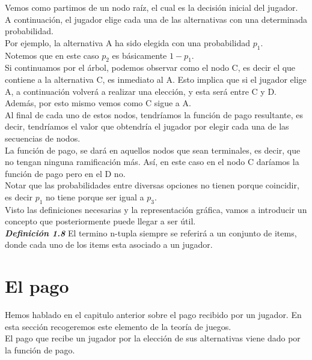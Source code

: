 \documentclass[10pt,a4paper]{book}
\begin{document}
Vemos como partimos de un nodo raíz, el cual es la decisión inicial del jugador. \\ 
A continuación, el jugador elige cada una de las alternativas con una determinada probabilidad.\\
Por ejemplo, la alternativa A ha sido elegida con una probabilidad $p_1$.\\
Notemos que en este caso $p_2$ es básicamente $1-p_1$.\\
Si continuamos por el árbol, podemos observar como el nodo C, es decir el que contiene a la alternativa C, es inmediato al A. Esto implica que si el jugador elige A, a continuación volverá a realizar una elección, y esta será entre C y D.\\
Además, por esto mismo vemos como C sigue a A.\\
Al final de cada uno de estos nodos, tendríamos la función de pago resultante, es decir, tendríamos el valor que obtendría el jugador por elegir cada una de las secuencias de nodos.\\

La función de pago, se dará en aquellos nodos que sean terminales, es decir, que no tengan ninguna ramificación más. Así, en este caso en el nodo C daríamos la función de pago pero en el D no.\\

Notar que las probabilidades entre diversas opciones no tienen porque coincidir, es decir $p_1$ no tiene porque ser igual a $p_3$.\\

Visto las definiciones necesarias y la representación gráfica, vamos a introducir un concepto que posteriormente puede llegar a ser útil. \\

\textit{\textbf{Definición 1.8}} El termino n-tupla siempre se referirá a un conjunto de items, donde cada uno de los items esta asociado a un jugador.\\

\newpage

\section{El pago}

Hemos hablado en el capitulo anterior sobre el pago recibido por un jugador. En esta sección recogeremos este elemento de la teoría de juegos.\\

El pago que recibe un jugador por la elección de sus alternativas viene dado por  la función de pago.\\
\end{document}
